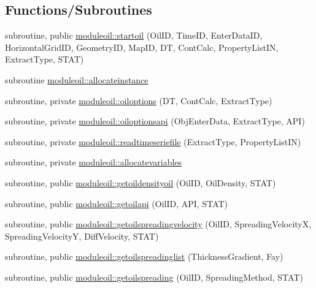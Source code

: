 \subsection*{Functions/\+Subroutines}
\begin{DoxyCompactItemize}
\item 
subroutine, public \mbox{\hyperlink{namespacemoduleoil_a65a42d1b037b7effaac748ed9de641b9}{moduleoil\+::startoil}} (Oil\+ID, Time\+ID, Enter\+Data\+ID, Horizontal\+Grid\+ID, Geometry\+ID, Map\+ID, DT, Cont\+Calc, Property\+List\+IN, Extract\+Type, S\+T\+AT)
\item 
subroutine \mbox{\hyperlink{namespacemoduleoil_a932062e4d214e9b1e3f8504bad7dee40}{moduleoil\+::allocateinstance}}
\item 
subroutine, private \mbox{\hyperlink{namespacemoduleoil_aed259a357945d0fe3281c34d220a6dcd}{moduleoil\+::oiloptions}} (DT, Cont\+Calc, Extract\+Type)
\item 
subroutine, private \mbox{\hyperlink{namespacemoduleoil_a25b9c130249a4691ccc1c06b3bae5a4e}{moduleoil\+::oiloptionsapi}} (Obj\+Enter\+Data, Extract\+Type, A\+PI)
\item 
subroutine, private \mbox{\hyperlink{namespacemoduleoil_add8d9c35ee53aee7829af9a0f4b3dff4}{moduleoil\+::readtimeseriefile}} (Extract\+Type, Property\+List\+IN)
\item 
subroutine, private \mbox{\hyperlink{namespacemoduleoil_af70b4b1248473e837294505db4f7ec5b}{moduleoil\+::allocatevariables}}
\item 
subroutine, public \mbox{\hyperlink{namespacemoduleoil_a957aec9748df48f4722e500b1f600985}{moduleoil\+::getoildensityoil}} (Oil\+ID, Oil\+Density, S\+T\+AT)
\item 
subroutine, public \mbox{\hyperlink{namespacemoduleoil_abeaffbf39f30e3630cefa9fdf3a69e82}{moduleoil\+::getoilapi}} (Oil\+ID, A\+PI, S\+T\+AT)
\item 
subroutine, public \mbox{\hyperlink{namespacemoduleoil_a110af1cd38e3c7128a98fb3d2bed2fdb}{moduleoil\+::getoilspreadingvelocity}} (Oil\+ID, Spreading\+VelocityX, Spreading\+VelocityY, Diff\+Velocity, S\+T\+AT)
\item 
subroutine, public \mbox{\hyperlink{namespacemoduleoil_a4bba14809f66e683d6b93c629e986fc5}{moduleoil\+::getoilspreadinglist}} (Thickness\+Gradient, Fay)
\item 
subroutine, public \mbox{\hyperlink{namespacemoduleoil_ab0850c594da69306ab36555f8971e6e4}{moduleoil\+::getoilspreading}} (Oil\+ID, Spreading\+Method, S\+T\+AT)
\item 

\end{DoxyCompactItemize}
